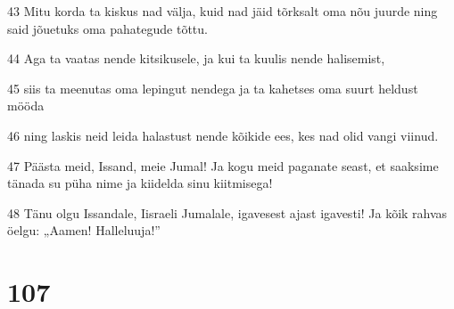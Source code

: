 \par 43 Mitu korda ta kiskus nad välja, kuid nad jäid tõrksalt oma nõu juurde ning said jõuetuks oma pahategude tõttu.
\par 44 Aga ta vaatas nende kitsikusele, ja kui ta kuulis nende halisemist,
\par 45 siis ta meenutas oma lepingut nendega ja ta kahetses oma suurt heldust mööda
\par 46 ning laskis neid leida halastust nende kõikide ees, kes nad olid vangi viinud.
\par 47 Päästa meid, Issand, meie Jumal! Ja kogu meid paganate seast, et saaksime tänada su püha nime ja kiidelda sinu kiitmisega!
\par 48 Tänu olgu Issandale, Iisraeli Jumalale, igavesest ajast igavesti! Ja kõik rahvas öelgu: „Aamen! Halleluuja!”

\chapter{107}

